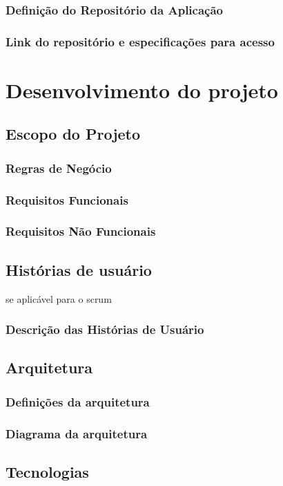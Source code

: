 \documentclass[
12pt,				%
openright,			%
twoside,			%
a4paper,			%
english,			%
french,				%
spanish,			%
brazil				%
]{abntex2}
\begin{document}
	\subsection{Definição do Repositório da Aplicação}
	\subsection{Link do repositório e especificações para acesso}
	
	
	\chapter{Desenvolvimento do projeto}
	\section{Escopo do Projeto}
	\subsection{Regras de Negócio}
	\subsection{Requisitos Funcionais}
	\subsection{Requisitos Não Funcionais}
	\section{Histórias de usuário}
	se aplicável para o scrum
	\subsection{Descrição das Histórias de Usuário}
	\section{Arquitetura}
	\subsection{Definições da arquitetura}
	\subsection{Diagrama da arquitetura}
	\section{Tecnologias}
\end{document}
